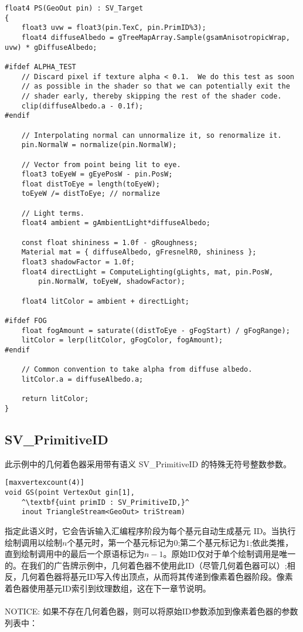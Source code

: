 \begin{lstlisting}
float4 PS(GeoOut pin) : SV_Target
{
    float3 uvw = float3(pin.TexC, pin.PrimID%3);
    float4 diffuseAlbedo = gTreeMapArray.Sample(gsamAnisotropicWrap, uvw) * gDiffuseAlbedo;

#ifdef ALPHA_TEST
    // Discard pixel if texture alpha < 0.1.  We do this test as soon 
    // as possible in the shader so that we can potentially exit the
    // shader early, thereby skipping the rest of the shader code.
    clip(diffuseAlbedo.a - 0.1f);
#endif

    // Interpolating normal can unnormalize it, so renormalize it.
    pin.NormalW = normalize(pin.NormalW);

    // Vector from point being lit to eye. 
    float3 toEyeW = gEyePosW - pin.PosW;
    float distToEye = length(toEyeW);
    toEyeW /= distToEye; // normalize

    // Light terms.
    float4 ambient = gAmbientLight*diffuseAlbedo;

    const float shininess = 1.0f - gRoughness;
    Material mat = { diffuseAlbedo, gFresnelR0, shininess };
    float3 shadowFactor = 1.0f;
    float4 directLight = ComputeLighting(gLights, mat, pin.PosW,
        pin.NormalW, toEyeW, shadowFactor);

    float4 litColor = ambient + directLight;

#ifdef FOG
    float fogAmount = saturate((distToEye - gFogStart) / gFogRange);
    litColor = lerp(litColor, gFogColor, fogAmount);
#endif

    // Common convention to take alpha from diffuse albedo.
    litColor.a = diffuseAlbedo.a;

    return litColor;
}
\end{lstlisting}

\subsection{SV_PrimitiveID}
\begin{flushleft}
此示例中的几何着色器采用带有语义 SV_PrimitiveID 的特殊无符号整数参数。
\end{flushleft}

\begin{lstlisting}[escapechar=^]
[maxvertexcount(4)]
void GS(point VertexOut gin[1],
    ^\textbf{uint primID : SV_PrimitiveID,}^
    inout TriangleStream<GeoOut> triStream)
\end{lstlisting}

\begin{flushleft}
指定此语义时，它会告诉输入汇编程序阶段为每个基元自动生成基元 ID。当执行绘制调用以绘制$n$个基元时，第一个基元标记为$0$;第二个基元标记为$1$;依此类推，直到绘制调用中的最后一个原语标记为$n-1$。原始ID仅对于单个绘制调用是唯一的。在我们的广告牌示例中，几何着色器不使用此ID（尽管几何着色器可以）;相反，几何着色器将基元ID写入传出顶点，从而将其传递到像素着色器阶段。像素着色器使用基元ID索引到纹理数组，这在下一章节说明。\\

~\\
NOTICE: 如果不存在几何着色器，则可以将原始ID参数添加到像素着色器的参数列表中：\\
\end{flushleft}

